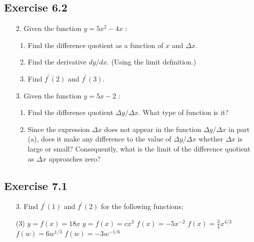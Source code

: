 \documentclass{./../../Latex/homework}
\begin{document}
\thispagestyle{plain}

\subsection*{Exercise 6.2}

\begin{enumerate}

\item[2.] Given the function $y=5 x^{2}-4 x$ :
\begin{enumerate}
\item Find the difference quotient as a function of $x$ and $\Delta x$.
\item Find the derivative $d y / d x$. (Using the limit definition.)
\item Find $f^{\prime}(2)$ and $f^{\prime}(3)$.
\end{enumerate}

\item[3.] Given the function $y=5 x-2$ :
\begin{enumerate}
\item Find the difference quotient $\Delta y / \Delta x$. What type of function is it?
\item Since the expression $\Delta x$ does not appear in the function $\Delta y / \Delta x$ in part (a), does it make any difference to the value of $\Delta y / \Delta x$ whether $\Delta x$ is large or small? Consequently, what is the limit of the difference quotient as $\Delta x$ approaches zero?
\end{enumerate}
\end{enumerate}

\subsection*{Exercise 7.1}

\begin{enumerate}

\item[3.] Find $f^{\prime}(1)$ and $f^{\prime}(2)$ for the following functions:
\begin{tasks}(3)
\task $y=f(x)=18 x$
\task $y=f(x)=c x^{3}$
\task $f(x)=-5 x^{-2}$
\task $f(x)=\frac{3}{4} x^{4 / 3}$
\task $f(w)=6 w^{1 / 3}$
\task $f(w)=-3 w^{-1 / 6}$
\end{tasks}
\end{enumerate}
\end{document}
